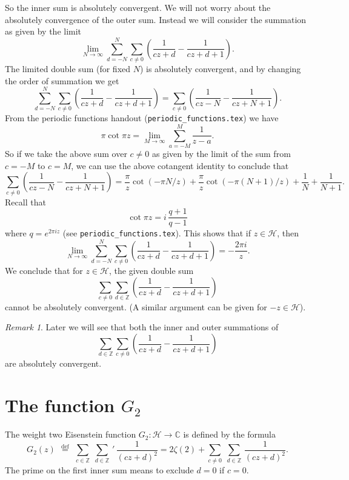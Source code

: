 \documentclass {amsart}
\theoremstyle{plain}
\theoremstyle{definition}
\theoremstyle{remark}
\newtheorem*{remark}{Remark}
\newcommand{\defeq}{\stackrel{\mathrm{def}}{\, = \,}}
\newcommand{\bZ}{{\mathbb{Z}}}
\newcommand{\bC}{{\mathbb{C}}}
\newcommand{\h}{{\mathcal{H}}}
\begin{document}
So the inner sum is absolutely convergent.
We will not worry about the absolutely convergence of the outer sum.
Instead we will consider the summation as given by the limit
$$
\lim_{N \to \infty}
\sum_{d = -N}^N \sum_{c \ne 0}  \left( \frac{1}{c z + d} - \frac{1}{c z + d + 1} \right).
$$
The limited double sum (for fixed $N$) is absolutely convergent, and
by changing the order of summation we get
$$
\sum_{d = -N}^N \sum_{c \ne 0}  \left( \frac{1}{c z + d} - \frac{1}{c z + d + 1} \right)
=
 \sum_{c \ne 0}  \left( \frac{1}{c z  - N} - \frac{1}{c z + N + 1} \right).
$$
From the periodic functions handout (\texttt{periodic\_functions.tex})
we have
$$
\pi \cot \pi z = \lim_{M \to \infty} \sum_{a = -M}^{M} \frac{1}{z - a}.
$$
So if we take the above sum over $c \ne 0$ as given by the limit of
the sum from $c = -M$ to $c=M$, we can use the above cotangent identity to conclude
that
$$
 \sum_{c \ne 0}  \left( \frac{1}{c z  - N} - \frac{1}{c z + N + 1} \right)
 =
\frac{\pi}{z} \cot (- \pi N/z ) + \frac{\pi}{z} \cot ( - \pi (N+ 1)/z )  + \frac{1}{N} + \frac{1}{N+1}.
$$
Recall that 
$$
\cot \pi z = i \, \frac{q + 1}{q - 1}
$$
where $q = e^{2 \pi i z}$ (see \texttt{periodic\_functions.tex}).
This shows that if  $z \in \h$, then 
$$
\lim_{N \to \infty}
\sum_{d = -N}^N \sum_{c \ne 0}  \left( \frac{1}{c z + d} - \frac{1}{c z + d + 1} \right)
= - \frac{2 \pi i} {z}.
$$
We conclude that for $z \in \h$, the given double sum
$$
\sum_{c \ne 0} \sum_{d\in\bZ} \left( \frac{1}{c z + d} - \frac{1}{c z + d + 1} \right)
$$
cannot be absolutely convergent.
(A similar argument can be given for $-z \in \h$).

\begin{remark}
Later we will see that both the inner and outer summations of
$$\sum_{d\in\bZ} \sum_{c \ne 0} \left( \frac{1}{c z + d} - \frac{1}{c z + d + 1} \right)$$
are absolutely convergent.
\end{remark}


\section {The function $G_2$}

The weight two Eisenstein function $G_2: \h \to \bC$ is defined by the formula
$$
G_2 (z) \; \defeq \; \sum_{c \in \bZ} \; \sum_{d \in \bZ}  \,'\, \frac{1}{(c z + d)^2}
= 2 \zeta (2) + \sum_{c \ne 0} \; \sum_{d \in \bZ} \, \frac{1}{(c z + d)^2}.
$$
The prime on the first inner sum means to exclude $d = 0$ if $c =0$.
\end{document}
